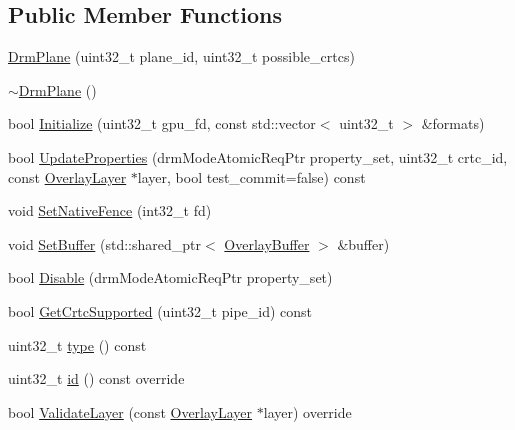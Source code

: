\subsection*{Public Member Functions}
\begin{DoxyCompactItemize}
\item 
\mbox{\hyperlink{classhwcomposer_1_1DrmPlane_ae2208912c8f4a58e3fc769ed98bb2b58}{Drm\+Plane}} (uint32\+\_\+t plane\+\_\+id, uint32\+\_\+t possible\+\_\+crtcs)
\item 
\mbox{\hyperlink{classhwcomposer_1_1DrmPlane_a5830385ee2e49d18c8dc7abf7b1da8ab}{$\sim$\+Drm\+Plane}} ()
\item 
bool \mbox{\hyperlink{classhwcomposer_1_1DrmPlane_ae6062735cfb8f43881b9f25ad4e8e1a7}{Initialize}} (uint32\+\_\+t gpu\+\_\+fd, const std\+::vector$<$ uint32\+\_\+t $>$ \&formats)
\item 
bool \mbox{\hyperlink{classhwcomposer_1_1DrmPlane_a50a1d74a0acdd8c4b213733f387fa695}{Update\+Properties}} (drm\+Mode\+Atomic\+Req\+Ptr property\+\_\+set, uint32\+\_\+t crtc\+\_\+id, const \mbox{\hyperlink{structhwcomposer_1_1OverlayLayer}{Overlay\+Layer}} $\ast$layer, bool test\+\_\+commit=false) const
\item 
void \mbox{\hyperlink{classhwcomposer_1_1DrmPlane_a8f904c14af7bfc4265640be4788d2096}{Set\+Native\+Fence}} (int32\+\_\+t fd)
\item 
void \mbox{\hyperlink{classhwcomposer_1_1DrmPlane_a17dbc59adab79a264b50e8727a6ad281}{Set\+Buffer}} (std\+::shared\+\_\+ptr$<$ \mbox{\hyperlink{classhwcomposer_1_1OverlayBuffer}{Overlay\+Buffer}} $>$ \&buffer)
\item 
bool \mbox{\hyperlink{classhwcomposer_1_1DrmPlane_a0efdb0b47954f95bb0ef0e99c2a3b697}{Disable}} (drm\+Mode\+Atomic\+Req\+Ptr property\+\_\+set)
\item 
bool \mbox{\hyperlink{classhwcomposer_1_1DrmPlane_a98c439ae5a59e4699183ad2ffed4e278}{Get\+Crtc\+Supported}} (uint32\+\_\+t pipe\+\_\+id) const
\item 
uint32\+\_\+t \mbox{\hyperlink{classhwcomposer_1_1DrmPlane_aeedfc2e6824d27a9dd754bf4ee27b274}{type}} () const
\item 
uint32\+\_\+t \mbox{\hyperlink{classhwcomposer_1_1DrmPlane_ae84fc513bfb1f3ee35715ff9a808f447}{id}} () const override
\item 
bool \mbox{\hyperlink{classhwcomposer_1_1DrmPlane_ad07df42def289d2dbbf9be4ad6748db8}{Validate\+Layer}} (const \mbox{\hyperlink{structhwcomposer_1_1OverlayLayer}{Overlay\+Layer}} $\ast$layer) override
\item 

\end{DoxyCompactItemize}
